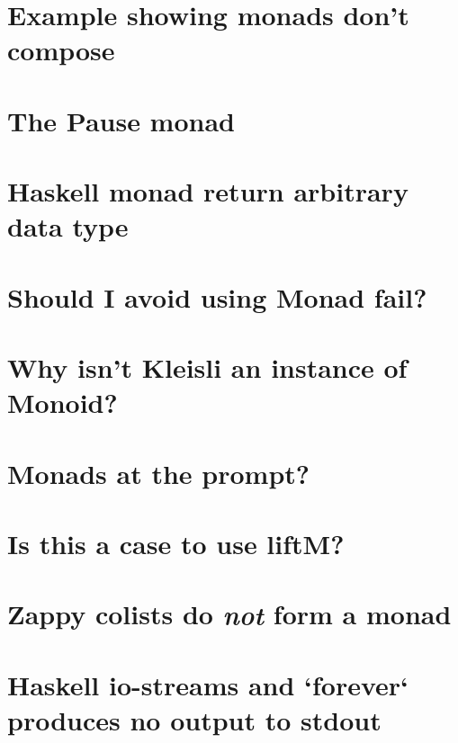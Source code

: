 \documentclass{book}
\begin{document}
\section{Example showing monads don't compose}


\section{The Pause monad}


\section{Haskell monad return arbitrary data type}


\section{Should I avoid using Monad fail?}


\section{Why isn't Kleisli an instance of Monoid?}


\section{Monads at the prompt?}


\section{Is this a case to use liftM?}


\section{Zappy colists do \emph{not} form a monad}


\section{Haskell io-streams and `forever` produces no output to stdout}



\end{document}

